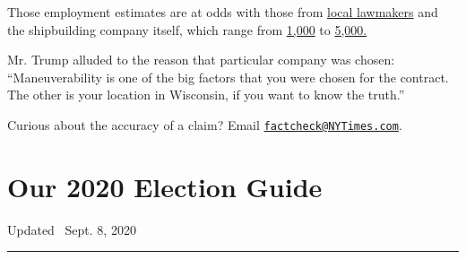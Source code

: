 Those employment estimates are at odds with those from
\href{https://gallagher.house.gov/media/press-releases/gallagher-ffg-x-contract-massive-win-northeast-wisconsin-free-world}{local
lawmakers} and the shipbuilding company itself, which range from
\href{https://www.baldwin.senate.gov/press-releases/wisconsin-to-build-new-ships}{1,000}
to
\href{https://insightonbusiness.com/business_articles/a-huge-huge-win/}{5,000.}

Mr. Trump alluded to the reason that particular company was chosen:
``Maneuverability is one of the big factors that you were chosen for the
contract. The other is your location in Wisconsin, if you want to know
the truth.''

Curious about the accuracy of a claim? Email
\href{mailto:factcheck@NYTimes.com}{\nolinkurl{factcheck@NYTimes.com}}.

\hypertarget{our-2020-election-guide}{%
\section{Our 2020 Election Guide}\label{our-2020-election-guide}}

Updated ~Sept. 8, 2020

\begin{center}\rule{0.5\linewidth}{\linethickness}\end{center}

